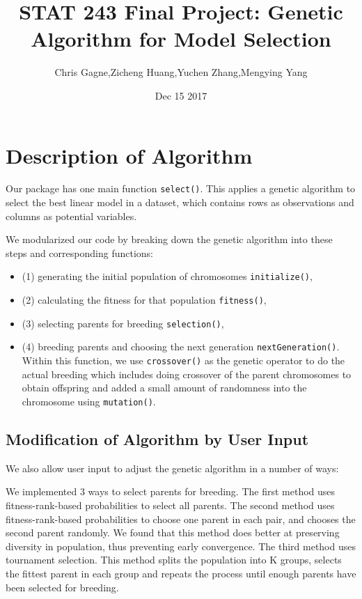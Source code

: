 \documentclass{article}\usepackage[]{graphicx}\usepackage[]{color}
\begin{document}
\title{STAT 243 Final Project: Genetic Algorithm for Model Selection}
\author{Chris Gagne,Zicheng Huang,Yuchen Zhang,Mengying Yang}
\date{Dec 15 2017}

\maketitle



\section*{Description of Algorithm}

Our package has one main function \texttt{select()}. This applies a genetic algorithm to select the best linear model in a dataset, which contains rows as observations and columns as potential variables.

We modularized our code by breaking down the genetic algorithm into these steps and corresponding functions:
\begin{itemize}
\item (1) generating the initial population of chromosomes  \texttt{initialize()},
\item (2) calculating the fitness for that population \texttt{fitness()},
\item (3) selecting parents for breeding \texttt{selection()},
\item (4) breeding parents and choosing the next generation \texttt{nextGeneration()}. Within this function, we use \texttt{crossover()} as the genetic operator to do the actual breeding which includes doing crossover of the parent chromosomes to obtain offspring and added a small amount of randomness into the chromosome using \texttt{mutation()}.
\end{itemize}

\subsection*{Modification of Algorithm by User Input}

We also allow user input to adjust the genetic algorithm in a number of ways:

We implemented 3 ways to select parents for breeding. The first method uses fitness-rank-based probabilities to select all parents. The second method uses fitness-rank-based probabilities to choose one parent in each pair, and chooses the second parent randomly. We found that this method does better at preserving diversity in population, thus preventing early convergence. The third method uses tournament selection. This method splits the population into K groups, selects the fittest parent in each group and repeats the process until enough parents have been selected for breeding.
\end{document}
